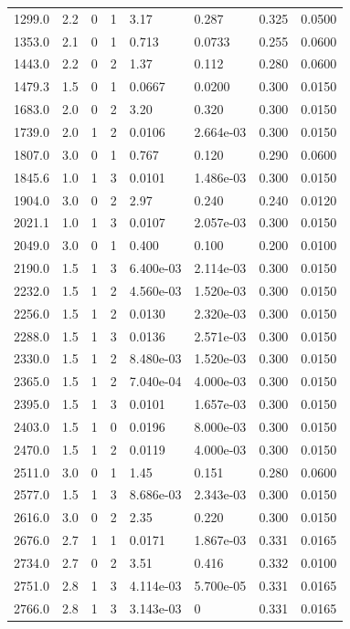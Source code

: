 \documentclass[preview]{standalone}
\begin{document}
{{\begin{tabular}{L{1.2cm}C{1.2cm} C{0.3cm}C{0.5cm} C{1.4cm}C{1.4cm} C{1.4cm}C{1.4cm}}
  1299.0  &   2.2  & 0     &  1 &  3.17  & 0.287  & 0.325 &  0.0500   \\ 
  1353.0  &   2.1  & 0     &  1 &  0.713  & 0.0733  & 0.255 &  0.0600   \\ 
  1443.0  &   2.2  & 0     &  2 &  1.37  & 0.112  & 0.280 &  0.0600   \\ 
  1479.3  &   1.5  & 0     &  1 &  0.0667  & 0.0200  & 0.300 &  0.0150   \\ 
  1683.0  &   2.0  & 0     &  2 &  3.20  & 0.320  & 0.300 &  0.0150   \\ 
  1739.0  &   2.0  & 1     &  2 &  0.0106  & 2.664e-03  & 0.300 &  0.0150   \\ 
  1807.0  &   3.0  & 0     &  1 &  0.767  & 0.120  & 0.290 &  0.0600   \\ 
  1845.6  &   1.0  & 1     &  3 &  0.0101  & 1.486e-03  & 0.300 &  0.0150   \\ 
  1904.0  &   3.0  & 0     &  2 &  2.97  & 0.240  & 0.240 &  0.0120   \\ 
  2021.1  &   1.0  & 1     &  3 &  0.0107  & 2.057e-03  & 0.300 &  0.0150   \\ 
  2049.0  &   3.0  & 0     &  1 &  0.400  & 0.100  & 0.200 &  0.0100   \\ 
  2190.0  &   1.5  & 1     &  3 &  6.400e-03  & 2.114e-03  & 0.300 &  0.0150   \\ 
  2232.0  &   1.5  & 1     &  2 &  4.560e-03  & 1.520e-03  & 0.300 &  0.0150   \\ 
  2256.0  &   1.5  & 1     &  2 &  0.0130  & 2.320e-03  & 0.300 &  0.0150   \\ 
  2288.0  &   1.5  & 1     &  3 &  0.0136  & 2.571e-03  & 0.300 &  0.0150   \\ 
  2330.0  &   1.5  & 1     &  2 &  8.480e-03  & 1.520e-03  & 0.300 &  0.0150   \\ 
  2365.0  &   1.5  & 1     &  2 &  7.040e-04  & 4.000e-03  & 0.300 &  0.0150   \\ 
  2395.0  &   1.5  & 1     &  3 &  0.0101  & 1.657e-03  & 0.300 &  0.0150   \\ 
  2403.0  &   1.5  & 1     &  0 &  0.0196  & 8.000e-03  & 0.300 &  0.0150   \\ 
  2470.0  &   1.5  & 1     &  2 &  0.0119  & 4.000e-03  & 0.300 &  0.0150   \\ 
  2511.0  &   3.0  & 0     &  1 &  1.45  & 0.151  & 0.280 &  0.0600   \\ 
  2577.0  &   1.5  & 1     &  3 &  8.686e-03  & 2.343e-03  & 0.300 &  0.0150   \\ 
  2616.0  &   3.0  & 0     &  2 &  2.35  & 0.220  & 0.300 &  0.0150   \\ 
  2676.0  &   2.7  & 1     &  1 &  0.0171  & 1.867e-03  & 0.331 &  0.0165   \\ 
  2734.0  &   2.7  & 0     &  2 &  3.51  & 0.416  & 0.332 &  0.0100   \\ 
  2751.0  &   2.8  & 1     &  3 &  4.114e-03  & 5.700e-05  & 0.331 &  0.0165   \\ 
  2766.0  &   2.8  & 1     &  3 &  3.143e-03  & 0  & 0.331 &  0.0165   \\ 
\hline 
\end{tabular} 

}}
\end{document}
